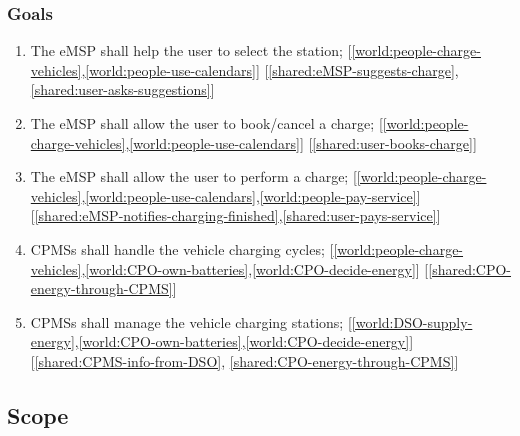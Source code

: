 \subsubsection{Goals}
%
\begin{enumerate}[label=G\arabic*]
    \item The \ac{eMSP} shall help the user to select the station; \label{goal:eMSP-helps-selecting} [\ref{world:people-charge-vehicles},\ref{world:people-use-calendars}] [\ref{shared:eMSP-suggests-charge},\ref{shared:user-asks-suggestions}]
    \item The \ac{eMSP} shall allow the user to book/cancel a charge; \label{goal:eMSP-booking-charge} [\ref{world:people-charge-vehicles},\ref{world:people-use-calendars}] [\ref{shared:user-books-charge}]
    \item The \ac{eMSP} shall allow the user to perform a charge; \label{goal:eMSP-allow-charge} [\ref{world:people-charge-vehicles},\ref{world:people-use-calendars},\ref{world:people-pay-service}] [\ref{shared:eMSP-notifies-charging-finished},\ref{shared:user-pays-service}]
    \item \acp{CPMS} shall handle the vehicle charging cycles; \label{goal:CPMS-handles-charge} [\ref{world:people-charge-vehicles},\ref{world:CPO-own-batteries},\ref{world:CPO-decide-energy}] [\ref{shared:CPO-energy-through-CPMS}]
    \item \acp{CPMS} shall manage the vehicle charging stations; \label{goal:CPMS-manage-station} [\ref{world:DSO-supply-energy},\ref{world:CPO-own-batteries},\ref{world:CPO-decide-energy}] [\ref{shared:CPMS-info-from-DSO}, \ref{shared:CPO-energy-through-CPMS}]
\end{enumerate}

\subsection{Scope}

